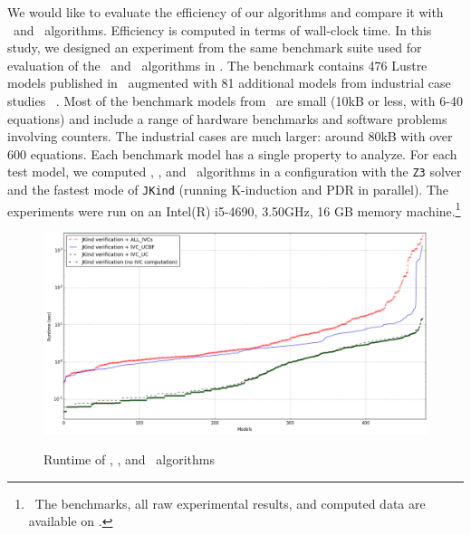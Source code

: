 
\newcommand{\takeaway}[1]{
\vspace{6pt}
\noindent\fbox{\parbox{\textwidth}{#1}}
\vspace{6pt}
}

 We would like to evaluate the efficiency
 of our algorithms and compare it with \ucalg ~and \ucbfalg ~algorithms.
 Efficiency is computed in terms of wall-clock time.
 In this study, we designed an experiment from
 the same benchmark suite used for evaluation of the \ucalg ~and \ucbfalg ~algorithms in \cite{Ghass16}.
 The benchmark contains 476 Lustre models
 published in~\cite{Hagen08:FMCAD} augmented
with 81 additional models from industrial case studies ~\cite{QFCS15:backes,hilt2013}.
 Most of
the benchmark models from~\cite{Hagen08:FMCAD} are small (10kB or less,
with 6-40 equations) and include a range of hardware benchmarks and
software problems involving counters.
The industrial cases are much
larger: around 80kB with over 600 equations.
Each benchmark model has a single property to analyze.
For each test model, we computed \aivcalg , \ucalg , and \ucbfalg ~algorithms
in a configuration with
the \texttt{Z3} solver and the fastest mode of \texttt{JKind} (running K-induction and PDR in parallel). The experiments
were run on an  Intel(R) i5-4690, 3.50GHz,
16 GB memory machine.\footnote{\noindent ~The benchmarks, all raw experimental results,
  and computed data are available on \cite{expr}.}

\begin{figure}[t]
 \centering
  \includegraphics[width=\textwidth]{figs/performance-sorted.png}
  \label{fig:performance}
  \vspace{-0.2in}
  \caption{Runtime of \aivcalg, \ucbfalg, and \ucalg ~algorithms}
\end{figure}


